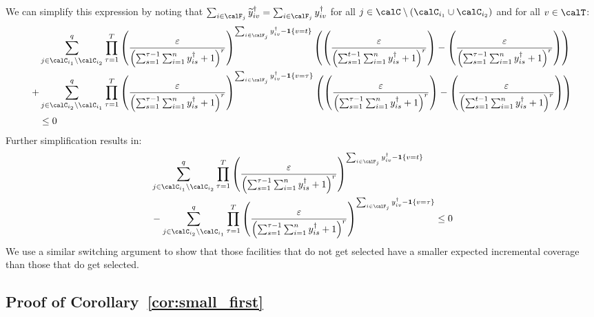 \documentclass[blindrev]{informs3noheader}
\begin{document}
We can simplify this expression by noting that $\sum_{i \in \calF_j} \widetilde{y}^\dagger_{iv}=\sum_{i \in \calF_j} y^\dagger_{iv}$ for all $j\in\calC\setminus(\calC_{i_1}\cup\calC_{i_2})$ and for all $v\in\calT$:
\begin{align*}
&\sum_{j \in \calC_{i_1} \setminus \calC_{i_2}}^q \prod_{\tau=1}^T \left(\frac{\varepsilon}{\left(\sum_{s=1}^{\tau-1} \sum_{i=1}^n y^\dagger_{is} +1\right)^r}\right)^{\sum_{i \in \calF_j} y^\dagger_{iv}-\mathbf{1}\{v=t\}} \left(\left(\frac{\varepsilon}{\left(\sum_{s=1}^{t-1} \sum_{i=1}^n y^\dagger_{is} +1\right)^r}\right)-\left(\frac{\varepsilon}{\left(\sum_{s=1}^{\tau-1} \sum_{i=1}^n y^\dagger_{is} +1\right)^r}\right)\right)
\\+&\sum_{j \in \calC_{i_2} \setminus \calC_{i_1}}^q \prod_{\tau=1}^T \left(\frac{\varepsilon}{\left(\sum_{s=1}^{\tau-1} \sum_{i=1}^n y^\dagger_{is} +1\right)^r}\right)^{\sum_{i \in \calF_j} y^\dagger_{iv}-\mathbf{1}\{v=\tau\}} \left(\left(\frac{\varepsilon}{\left(\sum_{s=1}^{\tau-1} \sum_{i=1}^n y^\dagger_{is} +1\right)^r}\right)-\left(\frac{\varepsilon}{\left(\sum_{s=1}^{t-1} \sum_{i=1}^n y^\dagger_{is} +1\right)^r}\right)\right)\\
&\leq 0
\end{align*}
Further simplification results in:
\begin{align*}
&\sum_{j \in \calC_{i_1} \setminus \calC_{i_2}}^q \prod_{\tau=1}^T \left(\frac{\varepsilon}{\left(\sum_{s=1}^{\tau-1} \sum_{i=1}^n y^\dagger_{is} +1\right)^r}\right)^{\sum_{i \in \calF_j} y^\dagger_{iv}-\mathbf{1}\{v=t\}}\\
&-\sum_{j \in \calC_{i_2} \setminus \calC_{i_1}}^q \prod_{\tau=1}^T \left(\frac{\varepsilon}{\left(\sum_{s=1}^{\tau-1} \sum_{i=1}^n y^\dagger_{is} +1\right)^r}\right)^{\sum_{i \in \calF_j} y^\dagger_{iv}-\mathbf{1}\{v=\tau\}}
\leq 0
\end{align*}
We use a similar switching argument to show that those facilities that do not get selected have a smaller expected incremental coverage than those that do get selected.\hfill\Halmos

\subsection{Proof of Corollary~\ref{cor:small_first}}
\end{document}
